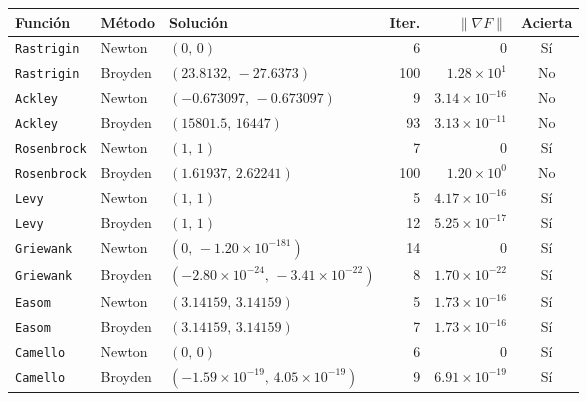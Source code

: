 \begin{tabular}{l l l r r c}
\toprule
\rowcolor{Azul1!50}
Función & Método & Solución & Iter. & $\|\nabla F\|$ & Acierta \\
\midrule
\texttt{Rastrigin} & Newton & $(0,\,0)$ & 6 & $0$ & Sí \\
\texttt{Rastrigin} & Broyden & $(23.8132,\,-27.6373)$ & 100 & $1.28\times10^{1}$ & No \\
\texttt{Ackley} & Newton & $(-0.673097,\,-0.673097)$ & 9 & $3.14\times10^{-16}$ & No \\
\texttt{Ackley} & Broyden & $(15801.5,\,16447)$ & 93 & $3.13\times10^{-11}$ & No \\
\texttt{Rosenbrock} & Newton & $(1,\,1)$ & 7 & $0$ & Sí \\
\texttt{Rosenbrock} & Broyden & $(1.61937,\,2.62241)$ & 100 & $1.20\times10^{0}$ & No \\
\texttt{Levy} & Newton & $(1,\,1)$ & 5 & $4.17\times10^{-16}$ & Sí \\
\texttt{Levy} & Broyden & $(1,\,1)$ & 12 & $5.25\times10^{-17}$ & Sí \\
\texttt{Griewank} & Newton & $(0,\,-1.20\times10^{-181})$ & 14 & $0$ & Sí \\
\texttt{Griewank} & Broyden & $(-2.80\times10^{-24},\,-3.41\times10^{-22})$ & 8 & $1.70\times10^{-22}$ & Sí \\
\texttt{Easom} & Newton & $(3.14159,\,3.14159)$ & 5 & $1.73\times10^{-16}$ & Sí \\
\texttt{Easom} & Broyden & $(3.14159,\,3.14159)$ & 7 & $1.73\times10^{-16}$ & Sí \\
\texttt{Camello} & Newton & $(0,\,0)$ & 6 & $0$ & Sí \\
\texttt{Camello} & Broyden & $(-1.59\times10^{-19},\,4.05\times10^{-19})$ & 9 & $6.91\times10^{-19}$ & Sí \\
\bottomrule
\end{tabular}
